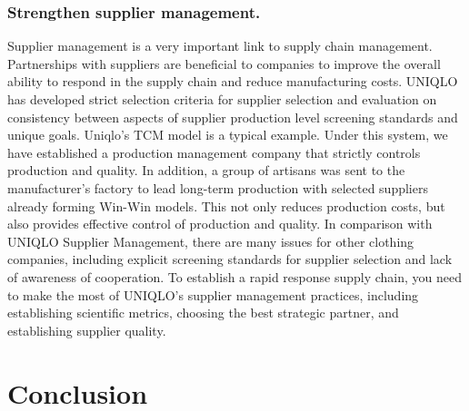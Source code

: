 \documentclass[12pt,]{article}
\begin{document}
\hypertarget{strengthen-supplier-management.}{%
\subsubsection{Strengthen supplier
management.}\label{strengthen-supplier-management.}}

Supplier management is a very important link to supply chain management.
Partnerships with suppliers are beneficial to companies to improve the
overall ability to respond in the supply chain and reduce manufacturing
costs. UNIQLO has developed strict selection criteria for supplier
selection and evaluation on consistency between aspects of supplier
production level screening standards and unique goals. Uniqlo's TCM
model is a typical example. Under this system, we have established a
production management company that strictly controls production and
quality. In addition, a group of artisans was sent to the manufacturer's
factory to lead long-term production with selected suppliers already
forming Win-Win models. This not only reduces production costs, but also
provides effective control of production and quality. In comparison with
UNIQLO Supplier Management, there are many issues for other clothing
companies, including explicit screening standards for supplier selection
and lack of awareness of cooperation. To establish a rapid response
supply chain, you need to make the most of UNIQLO's supplier management
practices, including establishing scientific metrics, choosing the best
strategic partner, and establishing supplier quality.

\hypertarget{conclusion}{%
\section{Conclusion}\label{conclusion}}
\end{document}
